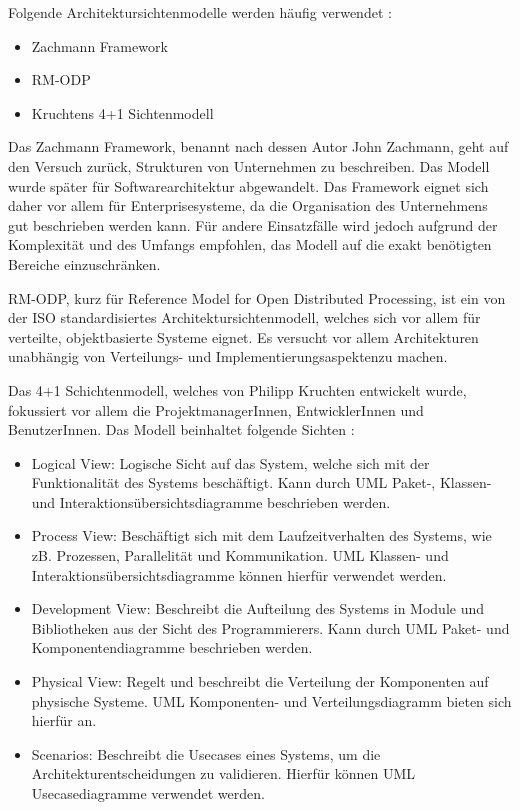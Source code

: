 Folgende Architektursichtenmodelle werden häufig verwendet \cite[S. 94]{softarch}:

\begin{itemize}
  \item Zachmann Framework
  \item RM-ODP
  \item Kruchtens 4+1 Sichtenmodell
\end{itemize}

Das Zachmann Framework, benannt nach dessen Autor John Zachmann, geht auf den Versuch zurück, Strukturen von Unternehmen zu beschreiben. Das Modell wurde später für Softwarearchitektur abgewandelt. Das Framework eignet sich daher vor allem für Enterprisesysteme, da die Organisation des Unternehmens gut beschrieben werden kann. Für andere Einsatzfälle wird jedoch aufgrund der Komplexität und des Umfangs empfohlen, das Modell auf die exakt benötigten Bereiche einzuschränken. \cite[S. 94-95]{softarch}

RM-ODP, kurz für Reference Model for Open Distributed Processing, ist ein von der ISO standardisiertes Architektursichtenmodell, welches sich vor allem für verteilte, objektbasierte Systeme eignet. Es versucht vor allem Architekturen unabhängig \glqq von Verteilungs- und Implementierungsaspekten\grqq zu machen. \cite{ISO_RMODP}\cite[S. 97-98]{softarch}

Das 4+1 Schichtenmodell, welches von Philipp Kruchten entwickelt wurde, fokussiert vor allem die ProjektmanagerInnen, EntwicklerInnen und BenutzerInnen. Das Modell beinhaltet folgende Sichten \cite{kruch}\cite[S. 501-503]{appluml}:

\begin{itemize}
  \item Logical View: Logische Sicht auf das System, welche sich mit der Funktionalität des Systems beschäftigt. Kann durch UML Paket-, Klassen- und Interaktionsübersichtsdiagramme beschrieben werden.
  \item Process View: Beschäftigt sich mit dem Laufzeitverhalten des Systems, wie zB. Prozessen, Parallelität und Kommunikation. UML Klassen- und Interaktionsübersichtsdiagramme können hierfür verwendet werden.
  \item Development View: Beschreibt die Aufteilung des Systems in Module und Bibliotheken aus der Sicht des Programmierers. Kann durch UML Paket- und Komponentendiagramme beschrieben werden.
  \item Physical View: Regelt und beschreibt die Verteilung der Komponenten auf physische Systeme. UML Komponenten- und Verteilungsdiagramm bieten sich hierfür an.
  \item Scenarios: Beschreibt die Usecases eines Systems, um die Architekturentscheidungen zu validieren. Hierfür können UML Usecasediagramme verwendet werden.
\end{itemize}


